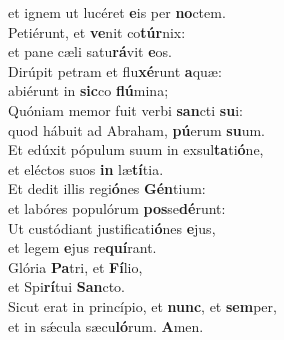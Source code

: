 \evenverse et ignem ut lucéret \textbf{e}is per \textbf{no}ctem.\\
\oddverse Petiérunt, et \textbf{ve}nit co\textbf{túr}nix:~\*\\
\oddverse et pane cæli satu\textbf{rá}vit \textbf{e}os.\\
\evenverse Dirúpit petram et flu\textbf{xé}runt \textbf{a}quæ:~\*\\
\evenverse abiérunt in \textbf{sic}co \textbf{flú}mina;\\
\oddverse Quóniam memor fuit verbi \textbf{san}cti \textbf{su}i:~\*\\
\oddverse quod hábuit ad Abraham, \textbf{pú}erum \textbf{su}um.\\
\evenverse Et edúxit pópulum suum in exsul\textbf{ta}ti\textbf{ó}ne,~\*\\
\evenverse et eléctos suos \textbf{in} læ\textbf{tí}tia.\\
\oddverse Et dedit illis regi\textbf{ó}nes \textbf{Gén}tium:~\*\\
\oddverse et labóres populórum \textbf{pos}se\textbf{dé}runt:\\
\evenverse Ut custódiant justificati\textbf{ó}nes \textbf{e}jus,~\*\\
\evenverse et legem \textbf{e}jus re\textbf{quí}rant.\\
\oddverse Glória \textbf{Pa}tri, et \textbf{Fí}lio,~\*\\
\oddverse et Spi\textbf{rí}tui \textbf{San}cto.\\
\evenverse Sicut erat in princípio, et \textbf{nunc}, et \textbf{sem}per,~\*\\
\evenverse et in sǽcula sæcu\textbf{ló}rum. \textbf{A}men.\\

